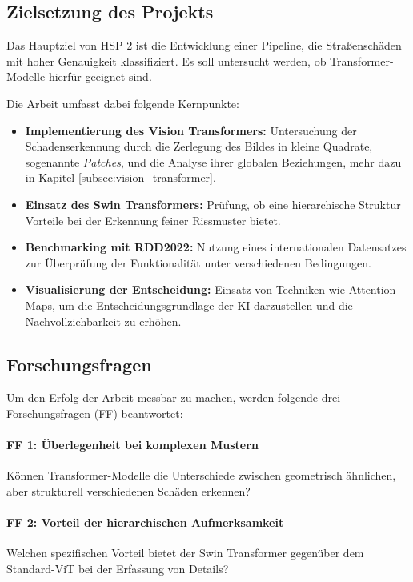 \subsection{Zielsetzung des Projekts}
\label{subsec:zielsetzung}

Das Hauptziel von HSP 2 ist die Entwicklung einer Pipeline, die Straßenschäden mit hoher Genauigkeit klassifiziert. Es soll untersucht werden, ob Transformer-Modelle hierfür geeignet sind.

Die Arbeit umfasst dabei folgende Kernpunkte:
\begin{itemize}
    \item \textbf{Implementierung des Vision Transformers:} Untersuchung der Schadenserkennung durch die Zerlegung des Bildes in kleine Quadrate, sogenannte \emph{Patches}, und die Analyse ihrer globalen Beziehungen, mehr dazu in Kapitel \ref{subsec:vision_transformer}.
    \item \textbf{Einsatz des Swin Transformers:} Prüfung, ob eine hierarchische Struktur Vorteile bei der Erkennung feiner Rissmuster bietet.
    \item \textbf{Benchmarking mit RDD2022:} Nutzung eines internationalen Datensatzes zur Überprüfung der Funktionalität unter verschiedenen Bedingungen.
    \item \textbf{Visualisierung der Entscheidung:} Einsatz von Techniken wie Attention-Maps, um die Entscheidungsgrundlage der KI darzustellen und die Nachvollziehbarkeit zu erhöhen.
\end{itemize}

\subsection{Forschungsfragen}
\label{subsec:forschungsfragen}

Um den Erfolg der Arbeit messbar zu machen, werden folgende drei Forschungsfragen (FF) beantwortet:

\paragraph{FF 1: Überlegenheit bei komplexen Mustern}
Können Transformer-Modelle die Unterschiede zwischen geometrisch ähnlichen, aber strukturell verschiedenen Schäden erkennen?

\paragraph{FF 2: Vorteil der hierarchischen Aufmerksamkeit}
Welchen spezifischen Vorteil bietet der Swin Transformer gegenüber dem Standard-ViT bei der Erfassung von Details?

